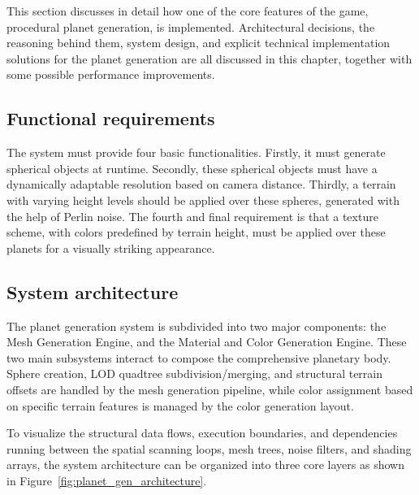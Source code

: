 \documentclass[12pt]{report}
\begin{document}
This section discusses in detail how one of the core features of the game, procedural planet generation, is implemented. Architectural decisions, the reasoning behind them, system design, and explicit technical implementation solutions for the planet generation are all discussed in this chapter, together with some possible performance improvements.

\subsection{Functional requirements}
The system must provide four basic functionalities. Firstly, it must generate spherical objects at runtime. Secondly, these spherical objects must have a dynamically adaptable resolution based on camera distance. Thirdly, a terrain with varying height levels should be applied over these spheres, generated with the help of Perlin noise. 
The fourth and final requirement is that a texture scheme, with colors predefined by terrain height, must be applied over these planets for a visually striking appearance. 

\subsection{System architecture}

The planet generation system is subdivided into two major components: the Mesh Generation Engine, and the Material and Color Generation Engine. These two main subsystems interact to compose the comprehensive planetary body. Sphere creation, LOD quadtree subdivision/merging, and structural terrain offsets are handled by the mesh generation pipeline, while color assignment based on specific terrain features is managed by the color generation layout.

To visualize the structural data flows, execution boundaries, and dependencies running between the spatial scanning loops, mesh trees, noise filters, and shading arrays, the system architecture can be organized into three core layers as shown in Figure~\ref{fig:planet_gen_architecture}.
\end{document}

